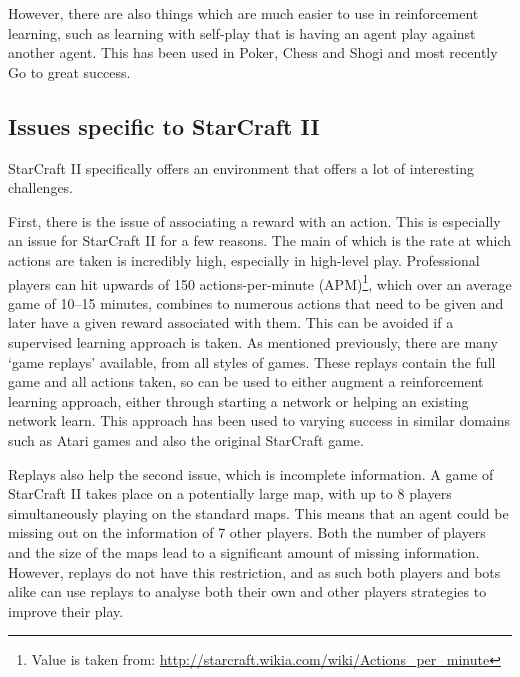 However, there are also things which are much easier to use in reinforcement
learning, such as learning with self-play that is having an agent play against
another agent. This has been used in Poker\cite{heinrich2016deep}, Chess and
Shogi\cite{silver2017mastering} and most recently
Go\cite{silver2016mastering,silver2017masteringgo} to great success.


\subsection{Issues specific to StarCraft II}

StarCraft II specifically offers an environment that offers a lot of interesting
challenges.

First, there is the issue of associating a reward with an action. This is
especially an issue for StarCraft II for a few reasons. The main of which is
the rate at which actions are taken is incredibly high, especially in high-level
play. Professional players can hit upwards of 150 actions-per-minute
(APM)\footnote{Value is taken from:
\url{http://starcraft.wikia.com/wiki/Actions_per_minute}}, which over an average
game of 10--15 minutes, combines to numerous actions that need to be given and
later have a given reward associated with them. This can be avoided if a supervised
learning approach is taken. As mentioned previously, there are many `game
replays' available, from all styles of games. These replays contain the full
game and all actions taken, so can be used to either augment a reinforcement
learning approach, either through starting a network or helping an existing
network learn. This approach has been used to varying success in similar domains
such as Atari games\cite{hester2018deep} and also the original StarCraft
game\cite{justesen2017learning}.

Replays also help the second issue, which is incomplete information.
A game of StarCraft II takes place on a potentially large map, with up to 8
players simultaneously playing on the standard maps. This means that an agent
could be missing out on the information of 7 other players. Both the number of
players and the size of the maps lead to a significant amount of missing information.
However, replays do not have this restriction, and as such both players and bots
alike can use replays to analyse both their own and other players strategies to
improve their play.

